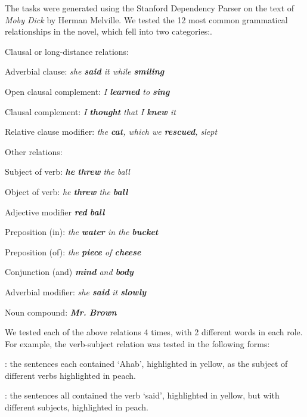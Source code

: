 The tasks were generated using the Stanford Dependency Parser \cite{de2006generating} on the text of \emph{Moby Dick} by Herman Melville.  We tested the 12 most common grammatical relationships in the novel, which fell into two categories:.

\squishlist
\item Clausal or long-distance relations:
	\squishlist
		\item {} Adverbial clause: \emph{  she \textbf{said} it while \textbf{smiling}}
		\item  {} Open clausal complement:  \emph{I \textbf{learned} to \textbf{sing} }
		\item  {} Clausal complement:  \emph{ I \textbf{thought} that I \textbf{knew} it}
		\item  {} Relative clause modifier:  \emph{the \textbf{cat}, which we \textbf{rescued}, slept }
	\squishend
\item Other relations:
		\squishlist
			\item {} Subject of verb: \emph{\textbf{he} \textbf{threw} the ball}
			\item {} Object of verb:  \emph{ he \textbf{threw} the \textbf{ball}}
			\item {} Adjective modifier \emph{\textbf{red} \textbf{ball}}
			\item {}  Preposition (in): \emph{ the \textbf{water} in the \textbf{bucket}}
			\item {}	Preposition (of):  \emph{ the \textbf{piece} of \textbf{cheese}}
			\item {}  Conjunction (and)  \emph{ \textbf{mind} and \textbf{body}}
		\item{} Adverbial modifier: \emph{  she \textbf{said} it \textbf{slowly}}
		\item {} Noun compound:  \emph{ \textbf{Mr.}  \textbf{Brown}}
		\squishend
\squishend

We tested each of the above relations 4 times, with 2 different words in each role. For example, the verb-subject relation  was tested in the following forms:
\squishlist
	\item {}:  the sentences each contained `Ahab', highlighted in yellow, as the subject of different verbs highlighted in peach.
	\item {}

	\item {}: the sentences all contained the verb `said', highlighted in yellow, but with different subjects, highlighted in peach.
	\item {}
\squishend


